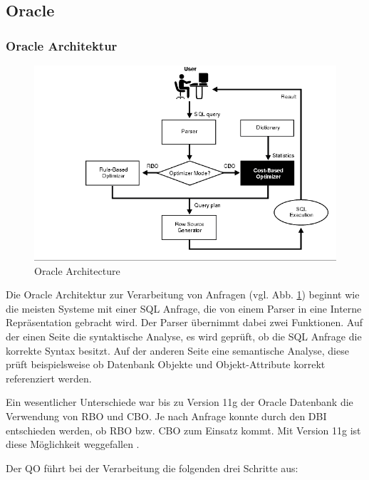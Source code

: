 \subsection{Oracle}
\subsubsection{Oracle Architektur}


\begin{figure}[ht]
  \centering
  \includegraphics[width=\textwidth]{02_Related_Work/OracleArchitecture.png}
  \caption{Oracle Architecture \cite{Oracle2004Basics}}
  \label{OracleArchitecture}
\end{figure}


Die Oracle Architektur zur Verarbeitung von Anfragen \cite{Oracle2004Basics}  (vgl. Abb. \ref{OracleArchitecture})  beginnt wie die meisten Systeme mit einer SQL Anfrage, die von einem Parser in eine Interne Repräsentation gebracht wird. Der Parser übernimmt dabei zwei Funktionen. Auf der einen Seite die syntaktische Analyse, es wird geprüft, ob die SQL Anfrage die korrekte Syntax besitzt. Auf der anderen Seite eine semantische Analyse, diese prüft beispielsweise ob Datenbank Objekte und Objekt-Attribute  korrekt referenziert werden. 

Ein wesentlicher Unterschiede war bis zu Version 11g der Oracle Datenbank die Verwendung von \ac{RBO} und \ac{CBO}. Je nach Anfrage konnte durch den \ac{DBI} entschieden werden, ob \ac{RBO} bzw. \ac{CBO} zum Einsatz kommt. Mit Version 11g ist diese Möglichkeit weggefallen \cite{dba_oracle2015}. 

Der \ac{QO} führt bei der Verarbeitung die folgenden drei Schritte aus:


